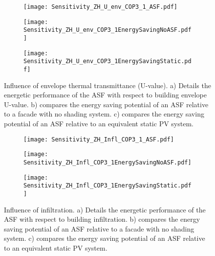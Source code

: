 \begin{figure}
    \centering
    \begin{subfigure}[b]{0.47\textwidth}
        \texttt{[image: Sensitivity\_ZH\_U\_env\_COP3\_1\_ASF.pdf]}
        \caption{} 
        \label{fig:envelopeASF} 
    \end{subfigure} \vfill
    \begin{subfigure}[b]{0.47\textwidth}
        \texttt{[image: Sensitivity\_ZH\_U\_env\_COP3\_1EnergySavingNoASF.pdf]}
        \caption{}
        \label{fig:envelopecompNo} 
    \end{subfigure} \hfill
    \begin{subfigure}[b]{0.47\textwidth}
        \texttt{[image: Sensitivity\_ZH\_U\_env\_COP3\_1EnergySavingStatic.pdf]}
        \caption{}
        \label{fig:envelopecompstatic} 
    \end{subfigure} 
    
    \caption{Influence of envelope thermal transmittance (U-value). a) Details the energetic performance of the ASF with respect to building envelope U-value. b) compares the energy saving potential of an ASF relative to a facade with no shading system. c) compares the energy saving potential of an ASF relative to an equivalent static PV system. }
    \label{fig:envelope}
\end{figure}


\begin{figure}
    \centering
    \begin{subfigure}[b]{0.47\textwidth}
        \texttt{[image: Sensitivity\_ZH\_Infl\_COP3\_1\_ASF.pdf]}
        \caption{} 
        \label{fig:infiltrationASF}
    \end{subfigure} \vfill
    \begin{subfigure}[b]{0.47\textwidth}
        \texttt{[image: Sensitivity\_ZH\_Infl\_COP3\_1EnergySavingNoASF.pdf]}
        \caption{}
        \label{fig:infiltrationcompNo}
    \end{subfigure}\hfill
    \begin{subfigure}[b]{0.47\textwidth}
        \texttt{[image: Sensitivity\_ZH\_Infl\_COP3\_1EnergySavingStatic.pdf]}
        \caption{}
        \label{fig:infiltrationcompstatic}
    \end{subfigure}
    \hfill
    \caption{Influence of infiltration. a) Details the energetic performance of the ASF with respect to building infiltration. b) compares the energy saving potential of an ASF relative to a facade with no shading system. c) compares the energy saving potential of an ASF relative to an equivalent static PV system.}
    \label{fig:infiltration}
\end{figure}


